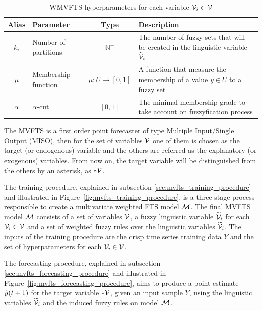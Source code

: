 \begin{table}[]
    \centering
    \begin{tabular}{|c|m{2cm}|c|m{}|} \hline
        \textbf{Alias} & \textbf{Parameter} & \textbf{Type} & \textbf{Description}  \\ \hline
         $k_i$ & Number of partitions & $\mathbb{N}^+$ & The number of fuzzy sets that will be created in the linguistic variable $\mlvar$  \\ \hline
         $\mu$ & Membership function & $\mu: U \rightarrow [0,1] $ & A function that measure the membership of a value $y \in U$ to a fuzzy set  \\\hline
         $\alpha$ & $\alpha$-cut & $[0,1]$ & The minimal membership grade to take account on fuzzyfication process \\ \hline
    \end{tabular}
    \caption{WMVFTS hyperparameters for each variable $\mathcal{V}_i \in \mathcal{V}$}
    \label{tab:mvfts_hyperparameters}
\end{table}

\index{$\mlvar$}\index{$\var$}\index{$\vari$}

The MVFTS is a first order point forecaster of type Multiple Input/Single Output (MISO), then for the set of variables $\var$ one of them is chosen as the target (or endogenous) variable and the others are referred as the explanatory (or exogenous) variables. From now on, the target variable will be distinguished from the others by an asterisk, as $*\mathcal{V}$.

The training procedure, explained in subsection \ref{sec:mvfts_training_procedure} and illustrated in Figure~\ref{fig:mvfts_training_procedure}, is a three stage process responsible to create a multivariate weighted FTS model $\mathcal{M}$. The final MVFTS model  $\mathcal{M}$ consists of a set of variables $\var$, a fuzzy linguistic variable $\mlvar$ for each $\mathcal{V}_i \in \mathcal{V}$ and a set of weighted fuzzy rules over the linguistic variables $\mlvar$. The inputs of the training procedure are the crisp time series training data $Y$ and the set of hyperparameters for each $\mathcal{V}_i \in \mathcal{V}$.

The forecasting procedure, explained in subsection \ref{sec:mvfts_forecasting_procedure} and illustrated in Figure~\ref{fig:mvfts_forecasting_procedure}, aims to produce a point estimate $\hat{y}(t+1)$ for the target variable $*\mathcal{V}$, given an input sample $Y$, using the linguistic variables $\mlvar$ and the induced fuzzy rules on model $\mathcal{M}$.

